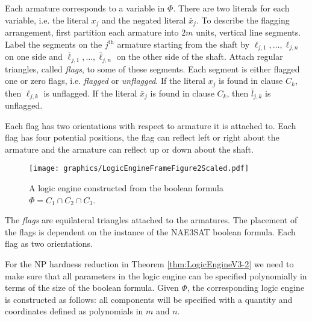 \documentclass[10pt]{CSUNthesis}
\theoremstyle{plain}%
\theoremstyle{definition}
\theoremstyle{remark}
\begin{document}
  Each armature corresponds to a variable in $\Phi$. There are two literals for each variable, i.e. the literal $x_j$ and the negated literal 
 $\bar{x}_j$.   
 To describe the flagging arrangement, first partition each armature into $2m$ units, vertical line segments. Label the segments on the $j^\text{th}$ armature starting from the shaft by $\ell_{j,1},\ldots,\ell_{j,n}$ on one side and  $\bar{\ell}_{j,1},\ldots,\bar{\ell}_{j,n}$ on the other side of the shaft.  
 Attach regular triangles, called \textit{flags}, to some of these segments. 
 Each segment is either flagged one or zero flags, i.e. \textit{flagged} or \textit{unflagged}. If the literal $x_j$ is found in clause $C_k$, then $\ell_{j,k}$ is unflagged.
   If the literal $\bar{x}_j$ is found in clause $C_k$, then $\bar{l}_{j,k}$ is unflagged.

Each flag has two orientations with respect to armature it is attached to.  Each flag has four potential positions, the flag can reflect left or right about the armature and the armature can reflect up or down about the shaft.
\begin{figure}[!h]
\begin{center}
\texttt{[image: graphics/LogicEngineFrameFigure2Scaled.pdf]}
\caption{A logic engine constructed from the boolean formula $\Phi = C_1 \cap C_2 \cap C_3$.}
\label{fig:LogicEngineFrameFigure2Scaled.pdf}
\end{center}
\end{figure}
The \textit{flags} are equilateral triangles
attached to the armatures.  The placement of the flags is dependent on the instance of the NAE3SAT 
boolean formula. Each flag as two orientations. 

For the NP hardness reduction in Theorem \ref{thm:LogicEngineV3-2} we need to make sure that all parameters in the logic engine can be specified polynomially in terms of the size of the boolean formula. Given $\Phi$, the corresponding logic engine is constructed as follows: all components will be specified with a 
quantity and coordinates defined as polynomials in $m$ and $n$.
\end{document}
